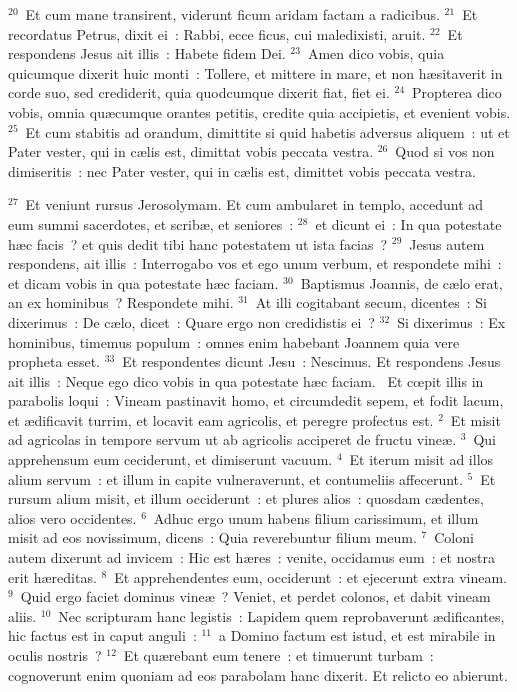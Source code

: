 ${}^{20}$~Et cum mane transirent, viderunt ficum aridam factam a radicibus.
${}^{21}$~Et recordatus Petrus, dixit ei~: Rabbi, ecce ficus, cui maledixisti, aruit.
${}^{22}$~Et respondens Jesus ait illis~: Habete fidem Dei.
${}^{23}$~Amen dico vobis, quia quicumque dixerit huic monti~: Tollere, et mittere in mare, et non h\ae sitaverit in corde suo, sed crediderit, quia quodcumque dixerit fiat, fiet ei.
${}^{24}$~Propterea dico vobis, omnia qu\ae cumque orantes petitis, credite quia accipietis, et evenient vobis.
${}^{25}$~Et cum stabitis ad orandum, dimittite si quid habetis adversus aliquem~: ut et Pater vester, qui in c\ae lis est, dimittat vobis peccata vestra.
${}^{26}$~Quod si vos non dimiseritis~: nec Pater vester, qui in c\ae lis est, dimittet vobis peccata vestra.


${}^{27}$~Et veniunt rursus Jerosolymam. Et cum ambularet in templo, accedunt ad eum summi sacerdotes, et scrib\ae , et seniores~:
${}^{28}$~et dicunt ei~: In qua potestate h\ae c facis~? et quis dedit tibi hanc potestatem ut ista facias~?
${}^{29}$~Jesus autem respondens, ait illis~: Interrogabo vos et ego unum verbum, et respondete mihi~: et dicam vobis in qua potestate h\ae c faciam.
${}^{30}$~Baptismus Joannis, de c\ae lo erat, an ex hominibus~? Respondete mihi.
${}^{31}$~At illi cogitabant secum, dicentes~: Si dixerimus~: De c\ae lo, dicet~: Quare ergo non credidistis ei~?
${}^{32}$~Si dixerimus~: Ex hominibus, timemus populum~: omnes enim habebant Joannem quia vere propheta esset.
${}^{33}$~Et respondentes dicunt Jesu~: Nescimus. Et respondens Jesus ait illis~: Neque ego dico vobis in qua potestate h\ae c faciam.
~\lettrine[lines=10,image=true,loversize=0.05,lraise=-0.03]{E}{}t cœpit illis in parabolis loqui~: Vineam pastinavit homo, et circumdedit sepem, et fodit lacum, et \ae dificavit turrim, et locavit eam agricolis, et peregre profectus est.
${}^{2}$~Et misit ad agricolas in tempore servum ut ab agricolis acciperet de fructu vine\ae .
${}^{3}$~Qui apprehensum eum ceciderunt, et dimiserunt vacuum.
${}^{4}$~Et iterum misit ad illos alium servum~: et illum in capite vulneraverunt, et contumeliis affecerunt.
${}^{5}$~Et rursum alium misit, et illum occiderunt~: et plures alios~: quosdam c\ae dentes, alios vero occidentes.
${}^{6}$~Adhuc ergo unum habens filium carissimum, et illum misit ad eos novissimum, dicens~: Quia reverebuntur filium meum.
${}^{7}$~Coloni autem dixerunt ad invicem~: Hic est h\ae res~: venite, occidamus eum~: et nostra erit h\ae reditas.
${}^{8}$~Et apprehendentes eum, occiderunt~: et ejecerunt extra vineam.
${}^{9}$~Quid ergo faciet dominus vine\ae~? Veniet, et perdet colonos, et dabit vineam aliis.
${}^{10}$~Nec scripturam hanc legistis~: Lapidem quem reprobaverunt \ae dificantes, hic factus est in caput anguli~:
${}^{11}$~a Domino factum est istud, et est mirabile in oculis nostris~?
${}^{12}$~Et qu\ae rebant eum tenere~: et timuerunt turbam~: cognoverunt enim quoniam ad eos parabolam hanc dixerit. Et relicto eo abierunt.


